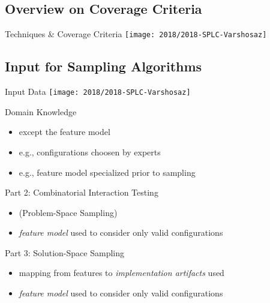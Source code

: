 \subsection{Overview on Coverage Criteria}
\begin{frame}{\myframetitle}
	\begin{definition}{Techniques \& Coverage Criteria \mysource{\samplingsurvey}}
		\texttt{[image: 2018/2018-SPLC-Varshosaz]}
	\end{definition}
\end{frame}

\subsection{Input for Sampling Algorithms}
\begin{frame}{\myframetitle}
	\begin{mycolumns}
		\begin{definition}{Input Data \mysource{\samplingsurvey}}
			\texttt{[image: 2018/2018-SPLC-Varshosaz]}
		\end{definition}
		\pause
		\begin{example}{Domain Knowledge \mysource{\samplingsurvey}}
			\begin{itemize}
				\item except the feature model
				\item e.g., configurations choosen by experts
				\item e.g., feature model specialized prior to sampling
			\end{itemize}
		\end{example}
	\mynextcolumn
		\pause\vspace{-5mm}
		\begin{example}{Part 2: Combinatorial Interaction Testing}
			\begin{itemize}
				\item (Problem-Space Sampling)
				\item \emph{feature model} used to consider only valid configurations
			\end{itemize}
		\end{example}
		\pause
		\begin{example}{Part 3: Solution-Space Sampling}
			\begin{itemize}
				\item mapping from features to \emph{implementation artifacts} used
				\item \emph{feature model} used to consider only valid configurations

\end{itemize}
\end{example}
\end{mycolumns}
\end{frame}
